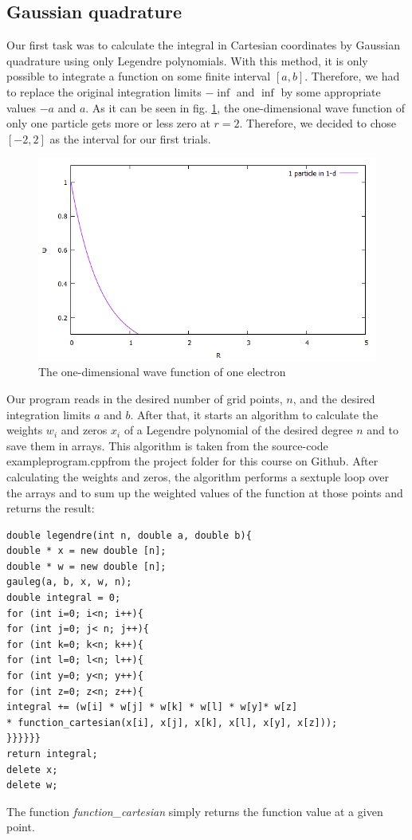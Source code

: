 \documentclass[10pt,a4paper]{article}
\begin{document}
\subsection{Gaussian quadrature}
Our first task was to calculate the integral in Cartesian coordinates by Gaussian quadrature using only Legendre polynomials. With this method, it is only possible to integrate a function on some finite interval $[a,b]$. Therefore, we had to replace the original integration limits $-\inf$ and $\inf$ by some appropriate values $-a$ and $a$. As it can be seen in fig. \ref{oneparticle}, the one-dimensional wave function of only one particle gets more or less zero at $r=2$. Therefore, we decided to chose $[-2,2]$ as the interval for our first trials.
\begin{figure}[h]
	\includegraphics[width=\textwidth]{Psi.png}
	\caption{The one-dimensional wave function of one electron \label{oneparticle}}
\end{figure}

Our program reads in the desired number of grid points, $n$, and the desired integration limits $a$ and $b$. After that, it starts an algorithm to calculate the weights $w_i$ and zeros $x_i$ of a Legendre polynomial of the desired degree $n$ and to save them in arrays. This algorithm is taken from the source-code \glqq exampleprogram.cpp\grqq from the project folder for this course on Github. After calculating the weights and zeros, the algorithm performs a sextuple loop over the arrays and to sum up the weighted values of the function at those points and returns the result:
\begin{lstlisting}
double legendre(int n, double a, double b){
double * x = new double [n];
double * w = new double [n];
gauleg(a, b, x, w, n);
double integral = 0;
for (int i=0; i<n; i++){
for (int j=0; j< n; j++){
for (int k=0; k<n; k++){
for (int l=0; l<n; l++){
for (int y=0; y<n; y++){
for (int z=0; z<n; z++){
integral += (w[i] * w[j] * w[k] * w[l] * w[y]* w[z]
* function_cartesian(x[i], x[j], x[k], x[l], x[y], x[z]));
}}}}}}
return integral;
delete x;
delete w;
\end{lstlisting}
The function \emph{function\_cartesian} simply returns the function value at a given point.
\end{document}
